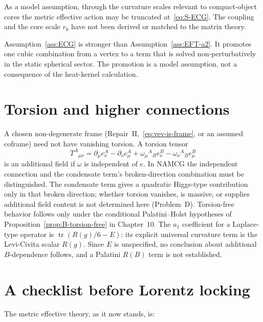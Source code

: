 \begin{assumption}
  \label{ass:ECG}
  As a model assumption, through the curvature scales relevant to
  compact-object cores the metric effective action may be truncated
  at~\eqref{eq:S-ECG}. The coupling and the core scale \(r_0\) have
  not been derived or matched to the matrix theory.
\end{assumption}

Assumption~\ref{ass:ECG} is stronger than Assumption~\ref{ass:EFT-a2}.
It promotes one cubic combination from a vertex to a term that is
solved non-perturbatively in the static spherical sector. The
promotion is a model assumption, not a consequence of the
heat-kernel calculation.

\section{Torsion and higher connections}
\label{sec:ch9-torsion}

A chosen non-degenerate frame (Repair~II,~\eqref{eq:vev-is-frame}, or an
assumed coframe) need not have
vanishing torsion. A torsion tensor
\begin{equation}
  \label{eq:torsion}
  T^A{}_{\mu\nu}
  =\partial_\mu e^A_\nu-\partial_\nu e^A_\mu
   +\omega_\mu{}^A{}_B e^B_\nu
   -\omega_\nu{}^A{}_B e^B_\mu
\end{equation}
is an additional field if \(\omega\) is independent of \(e\).
In NAMCG the independent connection and the condensate term's
broken-direction combination must be distinguished. The condensate
term gives a quadratic Higgs-type contribution only in that broken
direction; whether torsion vanishes, is massive, or supplies
additional field content is not determined here (Problem~D).
Torsion-free behavior follows only under the conditional
Palatini--Holst hypotheses of Proposition~\ref{prop:B-torsion-free}
in Chapter~10. The \(a_1\) coefficient for a Laplace-type operator
is \(\operatorname{tr}(R(g)/6-E)\): its explicit universal curvature
term is the Levi-Civita scalar \(R(g)\). Since \(E\) is unspecified,
no conclusion about additional \(B\)-dependence follows, and a
Palatini \(R(B)\) term is not established.

\section{A checklist before Lorentz locking}
\label{sec:ch9-check}

The metric effective theory, as it now stands, is:

